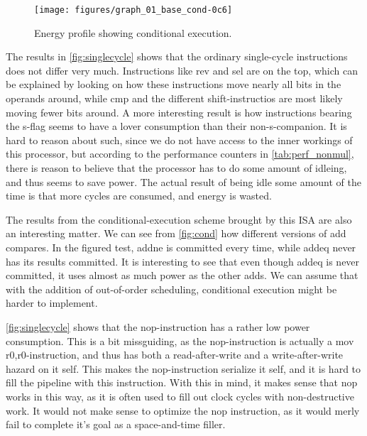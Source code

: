 \begin{figure}
    \centering
    \texttt{[image: figures/graph\_01\_base\_cond-0c6]}
    \caption{Energy profile showing conditional execution.}
    \label{fig:cond}
\end{figure}

The results in \autoref{fig:singlecycle} shows that the ordinary single-cycle instructions
does not differ very much. Instructions like {\ttfamily rev} and {\ttfamily sel} are on the
top, which can be explained by looking on how these instructions move nearly all bits in
the operands around, while {\ttfamily cmp} and the different shift-instructios are most likely
moving fewer bits around. A more interesting result is how instructions bearing the {\ttfamily s}-flag
seems to have a lover consumption than their non-{\ttfamily s}-companion. It is hard to reason about
such, since we do not have access to the inner workings of this processor, but according to the performance
counters in \autoref{tab:perf_nonmul}, there is reason to believe that the processor has to do some amount
of idleing, and thus seems to save power. The actual result of being idle some amount of the time is that
more cycles are consumed, and energy is wasted.

The results from the conditional-execution scheme brought by this ISA are also an interesting matter. We
can see from \autoref{fig:cond} how different versions of {\ttfamily add} compares. In the figured test,
{\ttfamily addne} is committed every time, while {\ttfamily addeq} never has its results committed. It is
interesting to see that even though {\ttfamily addeq} is never committed, it uses almost as much power as
the other {\ttfamily add}s. We can assume that with the addition of out-of-order scheduling, conditional
execution might be harder to implement.

\autoref{fig:singlecycle} shows that the {\ttfamily nop}-instruction has a rather low power consumption. This
is a bit missguiding, as the {\ttfamily nop}-instruction is actually a {\ttfamily mov r0,r0}-instruction, and thus
has both a read-after-write and a write-after-write hazard on it self. This makes the {\ttfamily nop}-instruction
serialize it self, and it is hard to fill the pipeline with this instruction. With this in mind, it makes sense
that {\ttfamily nop} works in this way, as it is often used to fill out clock cycles with non-destructive work. It
would not make sense to optimize the {\ttfamily nop} instruction, as it would merly fail to complete it's goal as
a space-and-time filler.

